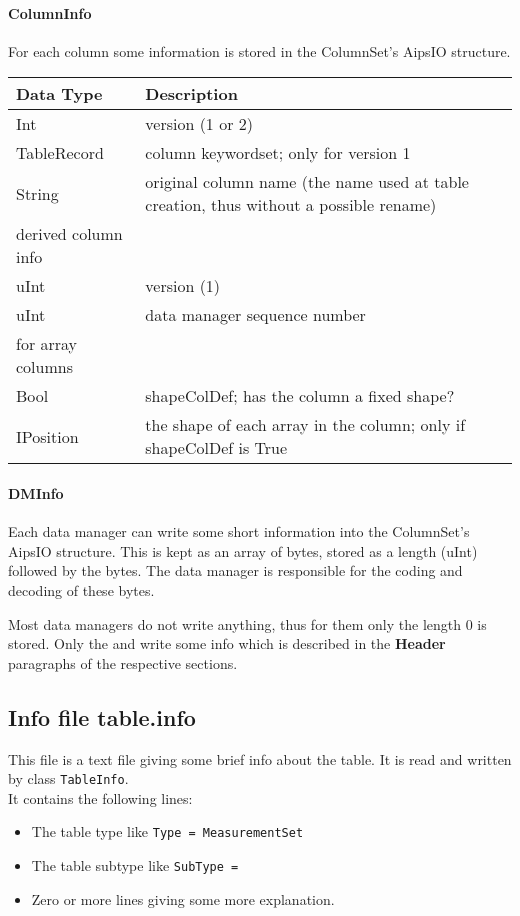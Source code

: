 \paragraph{\label{CTDS:COLUMNINFO}ColumnInfo\\}
For each column some information is stored in the ColumnSet's AipsIO
structure.

\vspace{0.15in}
\begin{tabular}{|l|p{13cm}|} \hline
  Data Type & Description \\ \hline\hline
  Int & version (1 or 2) \\
  TableRecord & column keywordset; only for version 1 \\
  String & original column name (the name used at table creation, thus
           without a possible rename) \\
  derived column info & \\
  \hline
  uInt & version (1) \\
  uInt & data manager sequence number \\
  \hline
  for array columns \\
  \hline
  Bool & shapeColDef; has the column a fixed shape? \\
  IPosition & the shape of each array in the column; only if
              shapeColDef is True \\
  \hline
\end{tabular}
\vspace{0.15in}

\paragraph{\label{CTDS:DMINFO}DMInfo\\}
Each data manager can write some short information into the
ColumnSet's AipsIO structure. This is kept as an array of bytes,
stored as a length (uInt) followed by the bytes.
The data manager is responsible for the coding and decoding of these
bytes.

Most data managers do not write anything, thus for them only the
length 0 is stored. Only the
 and
 write
some info which is described in the \textbf{Header} paragraphs of the
respective sections. 


\subsection{Info file table.info}
This file is a text file giving some brief info about the table. It is
read and written by class \texttt{TableInfo}.
\\It contains the following lines:
\begin{itemize}
\item The table type like \texttt{Type = MeasurementSet}
\item The table subtype like \texttt{SubType =}
\item Zero or more lines giving some more explanation.
\end{itemize}

